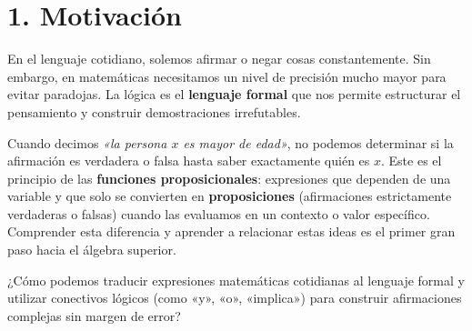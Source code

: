 \documentclass[11pt]{article}
\newenvironment{motivacion}{\section*{1. Motivación}}{}
\newenvironment{preguntaguia}{\begin{tcolorbox}[colback=cyan!5,colframe=cyan!75!black,title=Pregunta Guía]}{\end{tcolorbox}}
\begin{document}
\begin{motivacion}
  En el lenguaje cotidiano, solemos afirmar o negar cosas constantemente. Sin embargo, en matemáticas necesitamos un nivel de precisión mucho mayor para evitar paradojas. La lógica es el \textbf{lenguaje formal} que nos permite estructurar el pensamiento y construir demostraciones irrefutables. 
  
  Cuando decimos \textit{«la persona $x$ es mayor de edad»}, no podemos determinar si la afirmación es verdadera o falsa hasta saber exactamente quién es $x$. Este es el principio de las \textbf{funciones proposicionales}: expresiones que dependen de una variable y que solo se convierten en \textbf{proposiciones} (afirmaciones estrictamente verdaderas o falsas) cuando las evaluamos en un contexto o valor específico. Comprender esta diferencia y aprender a relacionar estas ideas es el primer gran paso hacia el álgebra superior.

  \begin{preguntaguia}
    ¿Cómo podemos traducir expresiones matemáticas cotidianas al lenguaje formal y utilizar conectivos lógicos (como «y», «o», «implica») para construir afirmaciones complejas sin margen de error?
  \end{preguntaguia}
\end{motivacion}
\end{document}
